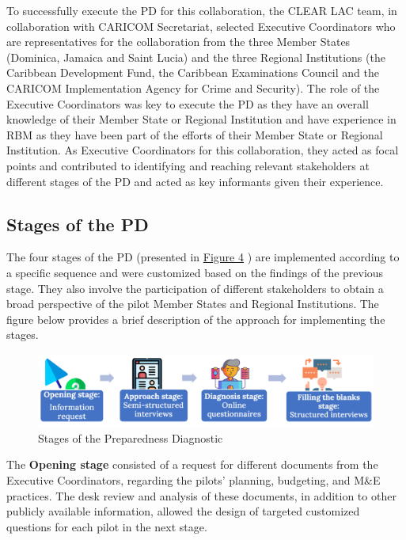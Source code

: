 \documentclass[
  10pt,
]{book}
\begin{document}
To successfully execute the PD for this collaboration, the CLEAR LAC team, in collaboration with CARICOM Secretariat, selected Executive Coordinators who are representatives for the collaboration from the three Member States (Dominica, Jamaica and Saint Lucia) and the three Regional Institutions (the Caribbean Development Fund, the Caribbean Examinations Council and the CARICOM Implementation Agency for Crime and Security). The role of the Executive Coordinators was key to execute the PD as they have an overall knowledge of their Member State or Regional Institution and have experience in RBM as they have been part of the efforts of their Member State or Regional Institution. As Executive Coordinators for this collaboration, they acted as focal points and contributed to identifying and reaching relevant stakeholders at different stages of the PD and acted as key informants given their experience.

\hypertarget{stages-of-the-pd}{%
\subsection*{Stages of the PD}\label{stages-of-the-pd}}

The four stages of the PD (presented in \protect\hyperlink{fig:figure4}{Figure 4} ) are implemented according to a specific sequence and were customized based on the findings of the previous stage. They also involve the participation of different stakeholders to obtain a broad perspective of the pilot Member States and Regional Institutions. The figure below provides a brief description of the approach for implementing the stages.

\begin{figure}
\includegraphics[width=1\linewidth]{./images/figure_4} \caption{Stages of the Preparedness Diagnostic}\label{fig:figure4}
\end{figure}

The \textbf{Opening stage} consisted of a request for different documents from the Executive Coordinators, regarding the pilots' planning, budgeting, and M\&E practices. The desk review and analysis of these documents, in addition to other publicly available information, allowed the design of targeted customized questions for each pilot in the next stage.
\end{document}
